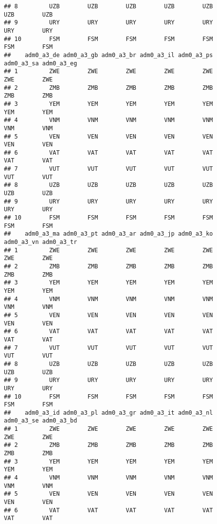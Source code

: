 \documentclass[
]{article}
\begin{document}
\begin{verbatim}
## 8         UZB        UZB        UZB        UZB        UZB        UZB        UZB
## 9         URY        URY        URY        URY        URY        URY        URY
## 10        FSM        FSM        FSM        FSM        FSM        FSM        FSM
##    adm0_a3_de adm0_a3_gb adm0_a3_br adm0_a3_il adm0_a3_ps adm0_a3_sa adm0_a3_eg
## 1         ZWE        ZWE        ZWE        ZWE        ZWE        ZWE        ZWE
## 2         ZMB        ZMB        ZMB        ZMB        ZMB        ZMB        ZMB
## 3         YEM        YEM        YEM        YEM        YEM        YEM        YEM
## 4         VNM        VNM        VNM        VNM        VNM        VNM        VNM
## 5         VEN        VEN        VEN        VEN        VEN        VEN        VEN
## 6         VAT        VAT        VAT        VAT        VAT        VAT        VAT
## 7         VUT        VUT        VUT        VUT        VUT        VUT        VUT
## 8         UZB        UZB        UZB        UZB        UZB        UZB        UZB
## 9         URY        URY        URY        URY        URY        URY        URY
## 10        FSM        FSM        FSM        FSM        FSM        FSM        FSM
##    adm0_a3_ma adm0_a3_pt adm0_a3_ar adm0_a3_jp adm0_a3_ko adm0_a3_vn adm0_a3_tr
## 1         ZWE        ZWE        ZWE        ZWE        ZWE        ZWE        ZWE
## 2         ZMB        ZMB        ZMB        ZMB        ZMB        ZMB        ZMB
## 3         YEM        YEM        YEM        YEM        YEM        YEM        YEM
## 4         VNM        VNM        VNM        VNM        VNM        VNM        VNM
## 5         VEN        VEN        VEN        VEN        VEN        VEN        VEN
## 6         VAT        VAT        VAT        VAT        VAT        VAT        VAT
## 7         VUT        VUT        VUT        VUT        VUT        VUT        VUT
## 8         UZB        UZB        UZB        UZB        UZB        UZB        UZB
## 9         URY        URY        URY        URY        URY        URY        URY
## 10        FSM        FSM        FSM        FSM        FSM        FSM        FSM
##    adm0_a3_id adm0_a3_pl adm0_a3_gr adm0_a3_it adm0_a3_nl adm0_a3_se adm0_a3_bd
## 1         ZWE        ZWE        ZWE        ZWE        ZWE        ZWE        ZWE
## 2         ZMB        ZMB        ZMB        ZMB        ZMB        ZMB        ZMB
## 3         YEM        YEM        YEM        YEM        YEM        YEM        YEM
## 4         VNM        VNM        VNM        VNM        VNM        VNM        VNM
## 5         VEN        VEN        VEN        VEN        VEN        VEN        VEN
## 6         VAT        VAT        VAT        VAT        VAT        VAT        VAT

\end{verbatim}
\end{document}
